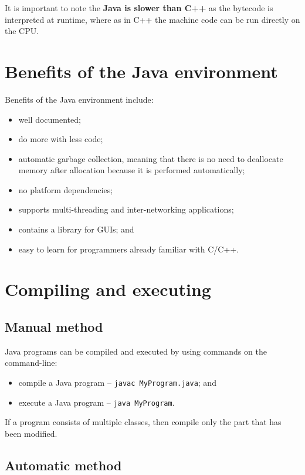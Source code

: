 \documentclass[a4paper]{systems-software}
\begin{document}
It is important to note the \textbf{Java is slower than C++} as the bytecode is interpreted at runtime, where as in C++ the machine code can be run directly on the CPU.


\section*{Benefits of the Java environment}

Benefits of the Java environment include:
\begin{itemize}
	\item well documented;
	\item do more with less code;
	\item automatic garbage collection, meaning that there is no need to deallocate memory after allocation because it is performed automatically;
	\item no platform dependencies;
	\item supports multi-threading and inter-networking applications;
	\item contains a library for GUIs; and
	\item easy to learn for programmers already familiar with C/C++.
\end{itemize}


\section*{Compiling and executing}

\subsection*{Manual method}

Java programs can be compiled and executed by using commands on the command-line:
\begin{itemize}
	\item compile a Java program -- \texttt{javac MyProgram.java}; and
	\item execute a Java program -- \texttt{java MyProgram}.
\end{itemize}

If a program consists of multiple classes, then compile only the part that has been modified.


\subsection*{Automatic method}
\end{document}
